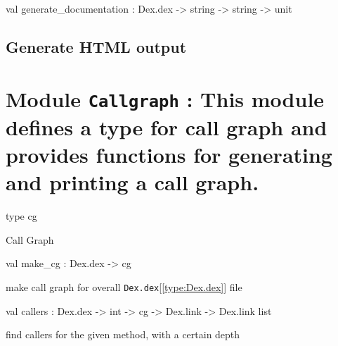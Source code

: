 \documentclass[11pt]{article}
\begin{document}
\ocamldocvspace{0.5cm}



\label{val:Htmlunparse.generate-underscoredocumentation}\begin{ocamldoccode}
val generate_documentation : Dex.dex -> string -> string -> unit
\end{ocamldoccode}
\begin{ocamldocdescription}
\subsection{Generate HTML output}



\end{ocamldocdescription}


\section{Module {\tt{Callgraph}} : This module defines a type for call graph and provides functions for
 generating and printing a call graph.}
\label{module:Callgraph}




\ocamldocvspace{0.5cm}



\label{type:Callgraph.cg}\begin{ocamldoccode}
type cg 
\end{ocamldoccode}
\begin{ocamldocdescription}
Call Graph


\end{ocamldocdescription}




\label{val:Callgraph.make-underscorecg}\begin{ocamldoccode}
val make_cg : Dex.dex -> cg
\end{ocamldoccode}
\begin{ocamldocdescription}
make call graph for overall {\tt{Dex.dex}}[\ref{type:Dex.dex}] file


\end{ocamldocdescription}




\label{val:Callgraph.callers}\begin{ocamldoccode}
val callers : Dex.dex -> int -> cg -> Dex.link -> Dex.link list
\end{ocamldoccode}
\begin{ocamldocdescription}
find callers for the given method, with a certain depth


\end{ocamldocdescription}
\end{document}
